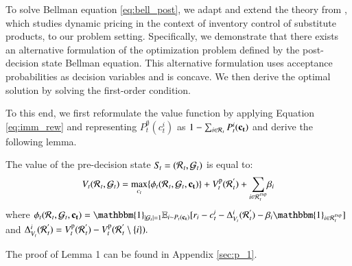 To solve Bellman equation \ref{eq:bell_post}, we adapt and extend the theory from \cite{dong2009dynamic}, which studies dynamic pricing in the context of inventory control of substitute products, to our problem setting. Specifically, we demonstrate that there exists an alternative formulation of the optimization problem defined by the post-decision state Bellman equation. This alternative formulation uses acceptance probabilities as decision variables and is concave. We then derive the optimal solution by solving the first-order condition.

To this end, we first reformulate the value function by applying Equation \eqref{eq:imm_rew} and representing $P^\emptyset_{t}(c_t^i)$ as $ 1 - \sum_{i \in \mathcal{R}\hspace{0.05em}_{t}}P^i_{t}(\mathbf{c_t})$ and derive the following lemma.
\begin{lemma}\label{lem:dynamic_programming}
The value of the pre-decision state $S\hspace{-0.1em}_t = (\mathcal{R}\hspace{0.05em}_{t},\mathcal{G}_t)$ is equal to:
$$ V_t(\mathcal{R}\hspace{0.05em}_{t},\mathcal{G}_t) = \max_{c_t} \{ \phi_t(\mathcal{R}\hspace{0.05em}_{t},\mathcal{G}_t,\mathbf{c_t}) \} + V^{\mathrm{p}}_{t}(\mathcal{R}\hspace{0.05em}_t^{'})  + \sum_{i \in \mathcal{R}\hspace{0.05em}_t^{\mathrm{exp}}}\! \beta_i $$
where 
$\phi_t(\mathcal{R}\hspace{0.05em}_{t},\mathcal{G}_t,\mathbf{c_t}) = \mathbbm{1}_{|\mathcal{G}_t|=1} \mathbb{E}_{i \sim P_t(\mathbf{c_t})} [r_i - c_t^i - \Delta^i_{V_{t}}(\mathcal{R}\hspace{0.05em}_t^{'}) -\beta_i\mathbbm{1}_{i \in \mathcal{R}\hspace{0.05em}_t^{\mathrm{exp}}}]$ and
$ \Delta^i_{V_{t}}(\mathcal{R}\hspace{0.05em}_t^{'}) = V^{\mathrm{p}}_{t}(\mathcal{R}\hspace{0.05em}_t^{'}) - V^{\mathrm{p}}_{t}(\mathcal{R}\hspace{0.05em}_t^{'} \setminus \{i\}).$

\end{lemma}
The proof of Lemma 1 can be found in Appendix \ref{sec:p_1}. 

